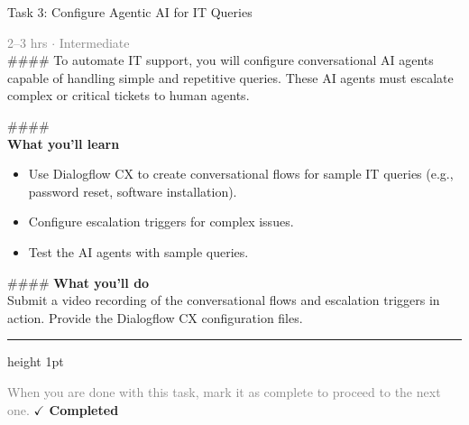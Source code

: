 \documentclass[10pt,a4paper]{article}
\begin{document}
\begin{taskbox}{Task 3: Configure Agentic AI for IT Queries}

    {\small \textcolor{gray}{2--3 hrs $\cdot$ Intermediate}}\\[12pt]

    \#\#\#\#   
To automate IT support, you will configure conversational AI agents capable of handling simple and repetitive queries. These AI agents must escalate complex or critical tickets to human agents.  

\#\#\#\# \\[10pt]
\vspace{8pt}
{\large \textbf{\textcolor{brandLight}{What you'll learn}}}\\[4pt]  
\begin{itemize}
    \item Use Dialogflow CX to create conversational flows for sample IT queries (e.g., password reset, software installation).  
    \item Configure escalation triggers for complex issues.  
    \item Test the AI agents with sample queries.  
\end{itemize}

\#\#\#\# \vspace{8pt}
{\large \textbf{\textcolor{brandLight}{What you'll do}}}\\[4pt]  
Submit a video recording of the conversational flows and escalation triggers in action. Provide the Dialogflow CX configuration files.\par

    \vspace{16pt}

    \textcolor{cardBorder}{\hrule height 1pt}\vspace{8pt}

    \small \textcolor{gray}{When you are done with this task, mark it as complete to proceed to the next one.} \hfill \textbf{\textcolor{brandDark}{$\checkmark$ Completed}}

\end{taskbox}
\end{document}
